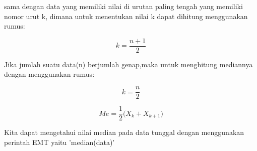\documentclass[a4paper,10pt]{article}
\begin{document}
\begin{eulernotebook}
\begin{eulercomment}
sama dengan data yang memiliki nilai di urutan paling tengah yang
memiliki nomor urut k, dimana untuk menentukan nilai k dapat dihitung
menggunakan rumus:\\
\end{eulercomment}
\begin{eulerformula}
\[
k = \frac{n+1}{2}
\]
\end{eulerformula}
\begin{eulercomment}
Jika jumlah suatu data(n) berjumlah genap,maka untuk menghitung
mediannya dengan menggunakan rumus:\\
\end{eulercomment}
\begin{eulerformula}
\[
k = \frac{n}{2}
\]
\end{eulerformula}
\begin{eulerformula}
\[
Me = \frac{1}{2}({X_k+X_{k+1})}
\]
\end{eulerformula}
\begin{eulercomment}
Kita dapat mengetahui nilai median pada data tunggal dengan
menggunakan perintah EMT yaitu 'median(data)'


\end{eulercomment}
\end{eulernotebook}
\end{document}
